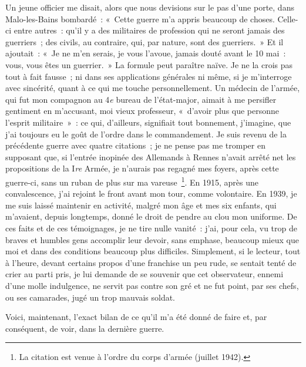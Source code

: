 \documentclass[french,twoside]{book} %
\begin{document}
Un jeune officier me disait, alors que nous devisions sur le pas d’une porte, dans Malo-les-Bains bombardé : « Cette guerre m’a appris beaucoup de choses. Celle-ci entre autres : qu’il y a des militaires de profession qui ne seront jamais des guerriers ;   des civils, au contraire, qui, par nature, sont des guerriers. » Et il ajoutait : « Je ne m’en serais, je vous l’avoue, jamais douté avant le 10 mai : vous, vous êtes un guerrier. » La formule peut paraître naïve. Je ne la crois pas tout à fait fausse ; ni dans ses applications générales ni même, si je m’interroge avec sincérité, quant à ce qui me touche personnellement. Un médecin de l’armée, qui fut mon compagnon au 4\emph{e} bureau de l’état-major, aimait à me persifler gentiment en m’accusant, moi vieux professeur, « d’avoir plus que personne l’esprit militaire » : ce qui, d’ailleurs, signifiait tout bonnement, j’imagine, que j’ai toujours eu le goût de l’ordre dans le commandement. Je suis revenu de la précédente guerre avec quatre citations ; je ne pense pas me tromper en supposant que, si l’entrée inopinée des Allemands à Rennes n’avait arrêté net les propositions de la I\emph{re} Armée, je n’aurais pas regagné mes foyers, après cette guerre-ci, sans un ruban de plus sur ma vareuse \footnote{La citation est venue à l’ordre du corps d’armée (juillet 1942).}. En 1915, après une convalescence, j’ai rejoint le front avant mon tour, comme volontaire. En 1939, je me suis laissé maintenir en activité, malgré mon âge et mes six enfants, qui m’avaient, depuis longtemps, donné le droit de pendre au clou mon uniforme. De ces faits et de ces témoignages, je ne tire nulle vanité : j’ai, pour cela, vu trop de braves et humbles gens accomplir leur devoir, sans emphase, beaucoup mieux que moi et dans des conditions beaucoup plus difficiles. Simplement, si le lecteur, tout à l’heure, devant certains propos d’une franchise un peu rude, se sentait tenté de crier au parti pris, je lui demande de se souvenir que cet observateur, ennemi d’une molle indulgence, ne servit pas contre son gré et ne fut point, par ses chefs, ou ses camarades, jugé un trop mauvais soldat.\par
  Voici, maintenant, l’exact bilan de ce qu’il m’a été donné de faire et, par conséquent, de voir, dans la dernière guerre.\par
\end{document}
